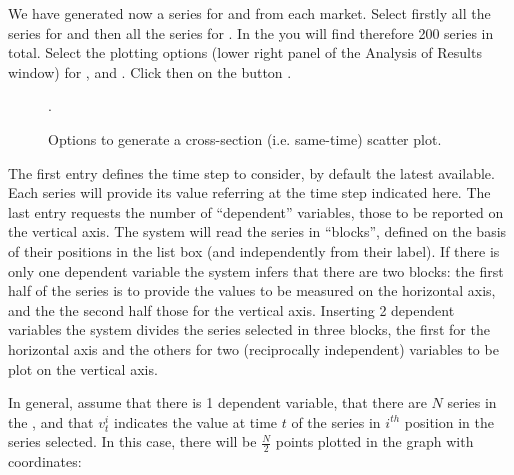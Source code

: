 \documentclass [11pt,a4paper] {book}
\begin{document}
We have generated now a series for  and  from each market. Select firstly all the series for  and then all the series for . In the  you will find therefore 200 series in total. Select the plotting options (lower right panel of the Analysis of Results window) for ,   and . Click then on the button .

\begin{figure}[ht]
  \centering
  \caption{\small Options to generate a cross-section (i.e. same-time) scatter plot.}.
   \label{fig:xycs}
\end{figure}

The first entry defines the time step to consider, by default the latest available. Each series will provide its value referring at the time step indicated here. The last entry requests the number of ``dependent'' variables, those to be reported on the vertical axis. The system will read the series in ``blocks'', defined on the basis of their positions in the  list box (and independently from their label). If there is only one dependent variable the system infers that there are two blocks: the first half of the series is to provide the values to be measured on the horizontal axis, and the the second half those for the vertical axis. Inserting 2 dependent variables the system divides the series selected in three blocks, the first for the horizontal axis and the others for two (reciprocally independent) variables to be plot on the vertical axis.

In general, assume that there is 1 dependent variable, that there are $N$ series in the , and that $v_{t}^i$ indicates the value at time $t$ of the series in $i^{th}$ position in the series selected. In this case, there will be $\frac{N}{2}$ points plotted in the graph with coordinates:
\end{document}
